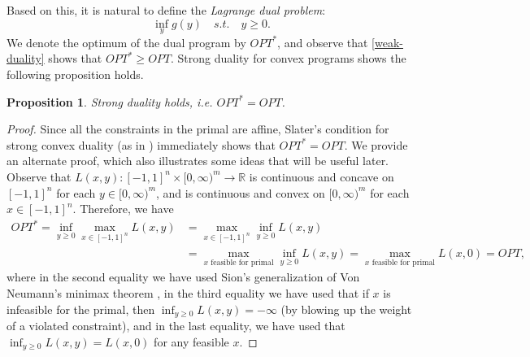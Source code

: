 \documentclass[final, 12pt]{colt2018}
\newtheorem{proposition}[theorem]{Proposition}
\theoremstyle{definition}
\theoremstyle{plain}
\begin{document}
Based on this, it is natural to define the \emph{Lagrange dual problem}: %
\[ \inf_y g(y) \quad s.t. \quad y \ge 0. \]
We denote the optimum of the dual program by $OPT^*$, and observe that \cref{weak-duality} shows that $OPT^* \geq OPT$. Strong duality for convex programs shows the following proposition holds.
\begin{proposition}
Strong duality holds, i.e. $OPT^* = OPT$.
\end{proposition}
\begin{proof}
Since all the constraints in the primal are affine, Slater's condition for strong convex duality (as in \citet{rockafellar}) immediately shows that $OPT^* = OPT$. 
We provide an alternate proof, which also illustrates some ideas that will be useful later. Observe that $L(x,y)\colon [-1,1]^{n} \times [0,\infty)^{m} \to \mathbb{R}$ is continuous and concave on $[-1,1]^{n}$ for each $y\in [0,\infty)^{m}$, and is continuous and convex on $[0,\infty)^{m}$ for each $x\in [-1,1]^{n}$. Therefore, we have  %
\begin{align*}
OPT^* = \inf_{y\geq 0} \max_{x\in [-1,1]^{n}} L(x,y) &= \max_{x \in [-1,1]^{n}} \inf_{y\geq 0} L(x,y) 
\\
&= \max_{x \text{ feasible for primal}} \inf_{y\geq 0}L(x,y) = \max_{x \text{ feasible for primal}} L(x,0) = OPT,
\end{align*}
where in the second equality we have used Sion's generalization of Von Neumann's minimax theorem \citep{sion1958general}, in the third equality we have used that if $x$ is infeasible for the primal, then $\inf_{y\geq 0} L(x,y) = -\infty$ (by blowing up the weight of a violated constraint), and in the last equality, we have used that $\inf_{y\geq 0}L(x,y)=L(x,0)$ for any feasible $x$.
\end{proof}
\end{document}
